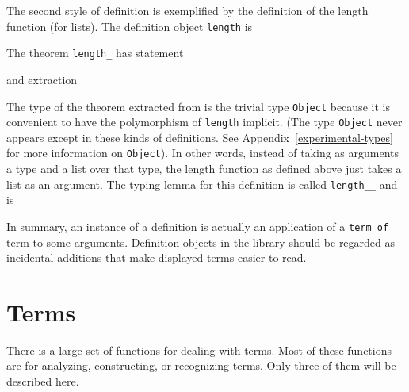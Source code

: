 The second style of definition is exemplified by the definition of the length
function (for lists).  The definition object {\tt length} is
\begin{Numath}
\end{Numath}%
The theorem {\tt length\_} has statement
\begin{Numath}
\end{Numath}%
and extraction
\begin{Numath}
\end{Numath}%
The type of the theorem extracted from is the trivial type {\tt Object}
because it is convenient to have the polymorphism of {\tt length} implicit.
(The type {\tt Object} never appears except in these kinds of definitions.
See Appendix~\ref{experimental-types} for more information on {\tt Object}).  In other words,
instead of taking as arguments a type and a list over that type, the length
function as defined above just takes a list as an argument.  The typing lemma
for this definition is called {\tt length\_\_} and is
\begin{Numath}
\end{Numath}%

In summary, an instance of a definition is actually an application of a 
{\tt term\_of} term to some arguments.
Definition objects in the library
should be
regarded as incidental additions that make displayed terms easier to read.

\section{Terms}

There is a large set of functions for dealing with terms.  
Most of these functions are for
analyzing, constructing, or recognizing terms.  Only three of them
will be described
here.



